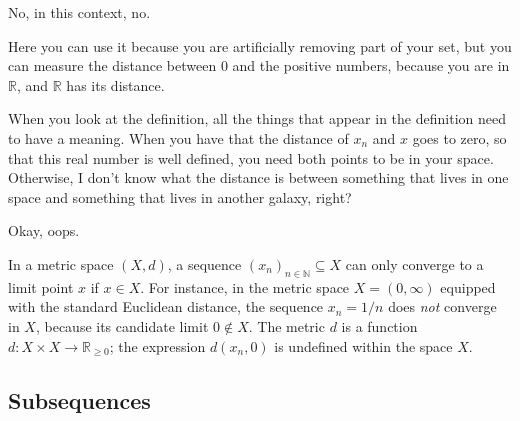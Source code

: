\begin{speech}[00:19:19 - 00:20:15]
No, in this context, no.


Here you can use it because you are artificially removing part of your set, but you can measure the distance between $0$ and the positive numbers, because you are in $\mathbb{R}$, and $\mathbb{R}$ has its distance.

When you look at the definition, all the things that appear in the definition need to have a meaning. When you have that the distance of $x_n$ and $x$ goes to zero, so that this real number is well defined, you need both points to be in your space. Otherwise, I don't know what the distance is between something that lives in one space and something that lives in another galaxy, right?

 Okay, oops.
\end{speech}

\begin{insight}
In a metric space $(X, d)$, a sequence $(x_n)_{n \in \mathbb{N}} \subseteq X$ can only converge to a limit point $x$ if $x \in X$. For instance, in the metric space $X = (0, \infty)$ equipped with the standard Euclidean distance, the sequence $x_n = 1/n$ does \emph{not} converge in $X$, because its candidate limit $0 \notin X$. The metric $d$ is a function $d \colon X \times X \to \mathbb{R}_{\ge 0}$; the expression $d(x_n, 0)$ is undefined within the space $X$.
\end{insight}

\begin{hidden}
\end{hidden}

\subsection{Subsequences}

